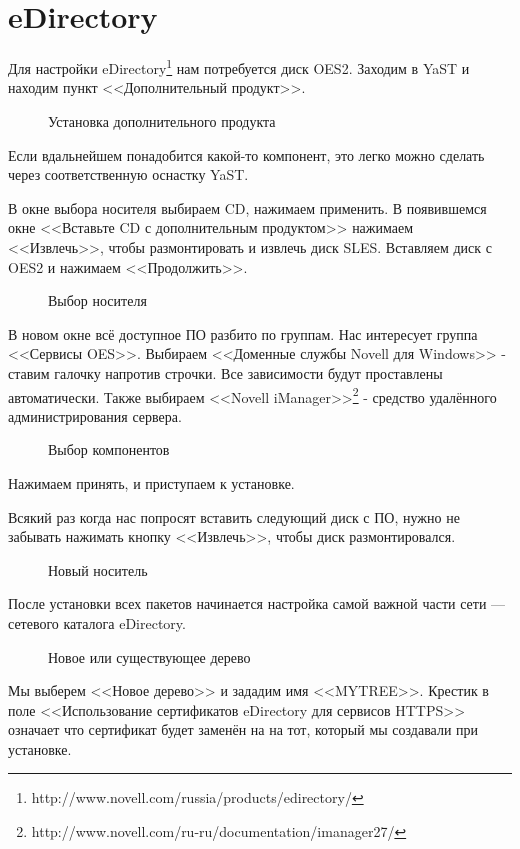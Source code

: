 \section{eDirectory}
Для настройки eDirectory\footnote{http://www.novell.com/russia/products/edirectory/} нам потребуется диск OES2. Заходим в YaST и находим пункт <<Дополнительный продукт>>. 
\begin{figure}[H]
\caption{Установка дополнительного продукта}
\end{figure}
Если вдальнейшем понадобится какой-то компонент, это легко можно сделать через соответственную оснастку YaST.
\clearpage

В окне выбора носителя выбираем CD, нажимаем применить. В появившемся окне <<Вставьте CD с дополнительным продуктом>> нажимаем <<Извлечь>>, чтобы размонтировать и извлечь диск SLES. Вставляем диск с OES2 и нажимаем <<Продолжить>>.
\begin{figure}[H]
\caption{Выбор носителя}
\end{figure}
\clearpage

В новом окне всё доступное ПО разбито по группам. Нас интересует группа <<Сервисы OES>>. Выбираем <<Доменные службы Novell для Windows>> - ставим галочку напротив строчки. Все зависимости будут проставлены автоматически. Также выбираем <<Novell iManager>>\footnote{http://www.novell.com/ru-ru/documentation/imanager27/} - средство удалённого администрирования сервера.
\begin{figure}[H]
\caption{Выбор компонентов}
\end{figure}
Нажимаем принять, и приступаем к установке.
\clearpage

Всякий раз когда нас попросят вставить следующий диск с ПО, нужно не забывать нажимать кнопку <<Извлечь>>, чтобы диск размонтировался.
\begin{figure}[H]
\caption{Новый носитель}
\end{figure}
\clearpage

После установки всех пакетов начинается настройка самой важной части сети --- сетевого каталога eDirectory.
\begin{figure}[H]
\caption{Новое или существующее дерево}
\end{figure}
Мы выберем <<Новое дерево>> и зададим имя <<MYTREE>>. Крестик в поле <<Использование сертификатов eDirectory для сервисов HTTPS>> означает что сертификат будет заменён на на тот, который мы создавали при установке.
\clearpage

